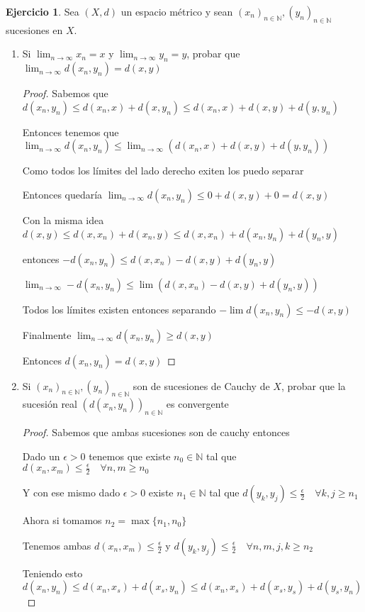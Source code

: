 \documentclass[11pt]{report}
\newcommand{\N}{\mathbb{N}}
\newcommand{\ra}{\rightarrow}
\theoremstyle{definition}
\newtheorem{ej}{Ejercicio}
\begin{document}
\begin{ej}
  Sea $(X,d)$ un espacio métrico y sean $(x_n)_{n \in \N}, (y_n)_{n \in \N}$ sucesiones en $X$.
  \begin{enumerate}
	  \item Si $\lim_{n\ra\infty} x_n = x$ y $\lim_{n\ra\infty} y_n = y$, probar que $\lim_{n \ra \infty} d(x_n,y_n) = d(x,y)$ 
      \begin{proof}
	Sabemos que $d(x_n , y_n) \leq d(x_n,x) + d(x,y_n) \leq d(x_n,x) + d(x,y) + d(y,y_n)$

	Entonces tenemos que $\lim_{n \ra \infty} d(x_n,y_n) \leq \lim_{n \ra \infty}{(d(x_n,x) + d(x,y) + d(y,y_n))}$

	Como todos los límites del lado derecho exiten los puedo separar

	Entonces quedaría $\lim_{n\ra\infty} d(x_n,y_n) \leq 0 + d(x,y) + 0= d(x,y)$

	Con la misma idea $d(x,y) \leq d(x,x_n) + d(x_n,y) \leq d(x,x_n) + d(x_n,y_n) + d(y_n ,y)$

	entonces $- d(x_n,y_n) \leq d(x,x_n) - d(x,y) + d(y_n,y)$

	$\lim_{n\ra\infty} - d(x_n,y_n) \leq \lim (d(x,x_n) - d(x,y) + d(y_n,y)) $ 

	Todos los límites existen entonces separando $-\lim d(x_n,y_n) \leq -d(x,y)$

	Finalmente $\lim_{n\ra\infty} d(x_n,y_n) \geq d(x,y)$

	Entonces $d(x_n,y_n) = d(x,y)$
      \end{proof}
    \item Si $(x_n)_{n \in \N}, (y_n)_{n \in \N}$ son de sucesiones de Cauchy de $X$, probar que la sucesión real $(d(x_n,y_n))_{n \in \N}$ es convergente
      \begin{proof}
	Sabemos que ambas sucesiones son de cauchy entonces 

	Dado un $\epsilon > 0$ tenemos que existe $n_0 \in \N$ tal que $d(x_n,x_m) \leq \frac{\epsilon}{2} \quad \forall n,m \geq n_0$

	Y con ese mismo dado $\epsilon > 0$ existe $n_1\in \N$ tal que $d(y_k,y_j) \leq \frac{\epsilon}{2} \quad \forall k,j\geq n_1 $

	Ahora si tomamos $n_2 = \max{\{n_1 ,n_0\}}$

	Tenemos ambas $d(x_n,x_m) \leq \frac{\epsilon}{2}$ y $d(y_k,y_j) \leq \frac{\epsilon}{2} \quad \forall n,m,j,k \geq n_2$


	Teniendo esto $d(x_n,y_n) \leq d(x_n ,x_{s}) + d(x_{s},y_n) \leq d(x_n,x_{s}) + d(x_{s},y_{s}) + d(y_{s},y_n)$


\end{proof}
\end{enumerate}
\end{ej}
\end{document}
